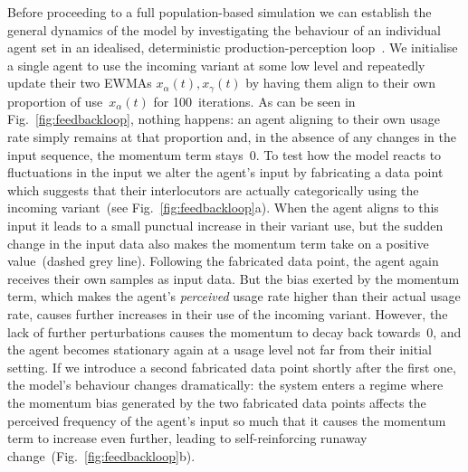 \documentclass[10pt]{article}
\begin{document}
Before proceeding to a full population-based simulation we can establish the general dynamics of the model by investigating the behaviour of an individual agent set in an idealised, deterministic production-perception loop~\citep{Wedel2006}.
We initialise a single agent to use the incoming variant at some low level and repeatedly update their two EWMAs $x_\alpha(t), x_\gamma(t)$ by having them align to their own proportion of use~$x_\alpha(t)$ for 100~iterations. As can be seen in Fig.~\ref{fig:feedbackloop}, nothing happens: an agent aligning to their own usage rate simply remains at that proportion and, in the absence of any changes in the input sequence, the momentum term stays~0. To test how the model reacts to fluctuations in the input we alter the agent's input by fabricating a data point which suggests that their interlocutors are actually categorically using the incoming variant~(see Fig.~\ref{fig:feedbackloop}a). When the agent aligns to this input it leads to a small punctual increase in their variant use, but the sudden change in the input data also makes the momentum term take on a positive value~(dashed grey line).
Following the fabricated data point, the agent again receives their own samples as input data. But the bias exerted by the momentum term, which makes the agent's \emph{perceived} usage rate higher than their actual usage rate, causes further increases in their use of the incoming variant. However, the lack of further perturbations causes the momentum to decay back towards~$0$, and the agent becomes stationary again at a usage level not far from their initial setting. If we introduce a second fabricated data point shortly after the first one, the model's behaviour changes dramatically: the system enters a regime where the momentum bias generated by the two fabricated data points affects the perceived frequency of the agent's input so much that it causes the momentum term to increase even further, leading to self-reinforcing runaway change~(Fig.~\ref{fig:feedbackloop}b).
\end{document}

